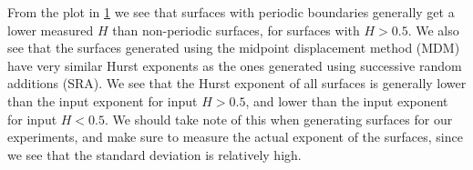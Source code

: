 \begin{figure}[!htb]
{        \label{fig:diamond_square_testing}%
    }%
\end{figure}%
%

From the plot in \cref{fig:diamond_square_testing} we see that surfaces with periodic boundaries generally get a lower measured $H$ than non-periodic surfaces, for surfaces with $H>0.5$. We also see that the surfaces generated using the midpoint displacement method (MDM) have very similar Hurst exponents as the ones generated using successive random additions (SRA). We see that the Hurst exponent of all surfaces is generally lower than the input exponent for input $H>0.5$, and lower than the input exponent for input $H<0.5$. We should take note of this when generating surfaces for our experiments, and make sure to measure the actual exponent of the surfaces, since we see that the standard deviation is relatively high.%
